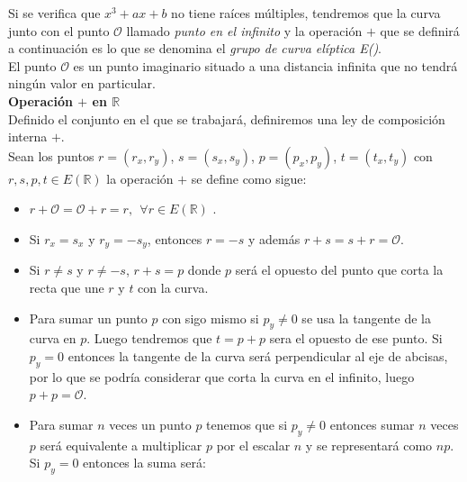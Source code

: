 Si se verifica que $x^3+ax+b$ no tiene raíces múltiples, tendremos que la curva junto con 
el punto $\mathcal{O}$ llamado \emph{punto en el infinito} y la operación $+$ que se definirá 
a continuación es lo que se denomina el \emph{grupo de curva elíptica E()}.\\
El punto $\mathcal{O}$ es un punto imaginario situado a una distancia infinita que no tendrá ningún valor en particular.\\

\textbf{Operación $+$ en $\mathbb{R}$}\\
Definido el conjunto en el que se trabajará, definiremos una ley de composición interna $+$.\\
Sean los puntos $r=(r_x,r_y)$, $s=(s_x,s_y)$, $p=(p_x,p_y)$, $t=(t_x,t_y)$ con $r,s,p,t \in E(\mathbb{R})$ la operación $+$ se define como sigue:
\begin{itemize}
	\item $r+\mathcal{O} = \mathcal{O}+r=r,\:\: \forall r \in E(\mathbb{R})$ .
	\item Si $r_x = s_x$ y $r_y = -s_y$, entonces $r=-s$ y además $r+s=s+r=\mathcal{O}$.
	\item Si $r\neq s$ y $r\neq -s$, $r+s=p$ donde $p$ será el opuesto del punto que corta la recta que une $r$ y $t$ con la curva.
	\item Para sumar un punto $p$ con sigo mismo si $p_y\neq0$ se usa la tangente de la curva en $p$. Luego tendremos que $t=p+p$ sera el opuesto de ese punto. Si $p_y=0$ entonces la tangente de la curva será perpendicular al eje de abcisas, por lo que se podría considerar que corta la curva en el infinito, luego $p+p=\mathcal{O}$.
	\item Para sumar $n$ veces un punto $p$ tenemos que si $p_y\neq 0$ entonces sumar $n$ veces $p$ será equivalente a multiplicar $p$ por el escalar $n$ y se representará como $np$. Si $p_y=0$ entonces la suma será:
\end{itemize}
